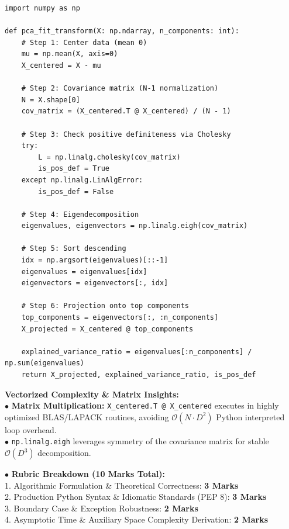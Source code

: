 \begin{solbox}
\begin{lstlisting}
import numpy as np

def pca_fit_transform(X: np.ndarray, n_components: int):
    # Step 1: Center data (mean 0)
    mu = np.mean(X, axis=0)
    X_centered = X - mu
    
    # Step 2: Covariance matrix (N-1 normalization)
    N = X.shape[0]
    cov_matrix = (X_centered.T @ X_centered) / (N - 1)
    
    # Step 3: Check positive definiteness via Cholesky
    try:
        L = np.linalg.cholesky(cov_matrix)
        is_pos_def = True
    except np.linalg.LinAlgError:
        is_pos_def = False
        
    # Step 4: Eigendecomposition
    eigenvalues, eigenvectors = np.linalg.eigh(cov_matrix)
    
    # Step 5: Sort descending
    idx = np.argsort(eigenvalues)[::-1]
    eigenvalues = eigenvalues[idx]
    eigenvectors = eigenvectors[:, idx]
    
    # Step 6: Projection onto top components
    top_components = eigenvectors[:, :n_components]
    X_projected = X_centered @ top_components
    
    explained_variance_ratio = eigenvalues[:n_components] / np.sum(eigenvalues)
    return X_projected, explained_variance_ratio, is_pos_def
\end{lstlisting}
\textbf{Vectorized Complexity \& Matrix Insights:}\\
$\bullet$ \textbf{Matrix Multiplication:} \texttt{X\_centered.T @ X\_centered} executes in highly optimized BLAS/LAPACK routines, avoiding $\mathcal{O}(N \cdot D^2)$ Python interpreted loop overhead.\\
$\bullet$ \texttt{np.linalg.eigh} leverages symmetry of the covariance matrix for stable $\mathcal{O}(D^3)$ decomposition.
\end{solbox}

\begin{examinertip}
$\bullet$ \textbf{Rubric Breakdown (10 Marks Total):}\\
1. Algorithmic Formulation \& Theoretical Correctness: \textbf{3 Marks}\\
2. Production Python Syntax \& Idiomatic Standards (PEP 8): \textbf{3 Marks}\\
3. Boundary Case \& Exception Robustness: \textbf{2 Marks}\\
4. Asymptotic Time \& Auxiliary Space Complexity Derivation: \textbf{2 Marks}
\end{examinertip}
